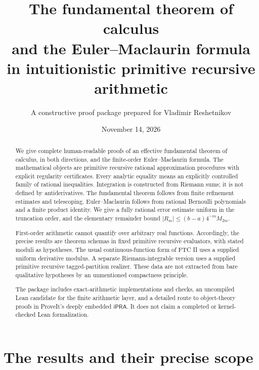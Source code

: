 \documentclass[11pt]{article}
\title{The fundamental theorem of calculus\protect\\and the Euler--Maclaurin formula\protect\\in intuitionistic primitive recursive arithmetic}
\author{A constructive proof package prepared for Vladimir Reshetnikov}
\date{November 14, 2026}
\theoremstyle{definition}
\newcommand{\ipra}{\ensuremath{\mathsf{iPRA}}}
\newcommand{\abs}[1]{\left|#1\right|}
\begin{document}
\maketitle
\begin{abstract}
We give complete human-readable proofs of an effective fundamental theorem
of calculus, in both directions, and the finite-order Euler--Maclaurin
formula.  The mathematical objects are primitive recursive rational
approximation procedures with explicit regularity certificates.  Every
analytic equality means an explicitly controlled family of rational
inequalities.  Integration is constructed from Riemann sums; it is not
defined by antiderivatives.  The fundamental theorem follows from finite
refinement estimates and telescoping.  Euler--Maclaurin follows from
rational Bernoulli polynomials and a finite product identity.  We give a
fully rational error estimate uniform in the truncation order, and the
elementary remainder bound
\(\abs{R_m}\le (b-a)4^{-m}M_{2m}\).

First-order arithmetic cannot quantify over arbitrary real functions.
Accordingly, the precise results are theorem schemas in fixed primitive
recursive evaluators, with stated moduli as hypotheses.  The usual
continuous-function form of FTC II uses a supplied uniform derivative
modulus.  A separate Riemann-integrable version uses a supplied primitive
recursive tagged-partition realizer.  These data are not extracted from
bare qualitative hypotheses by an unmentioned compactness principle.

The package includes exact-arithmetic implementations and checks, an
uncompiled Lean candidate for the finite arithmetic layer, and a detailed
route to object-theory proofs in ProveIt's deeply embedded \ipra.  It does
not claim a completed or kernel-checked Lean formalization.
\end{abstract}
\newpage
\tableofcontents
\newpage

\section{The results and their precise scope}\label{sec:scope}
\end{document}
